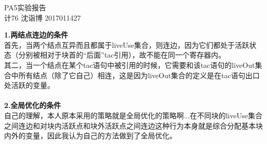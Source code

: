 \documentclass[UTF8]{ctexart}
\begin{document}
\begin{center}
PA5实验报告\\
计76 沈诣博 2017011427
\end{center}
\textbf{1.两结点连边的条件}\\
首先，当两个结点互异而且都属于liveUse集合，则连边，因为它们都处于活跃状态（分别被相对于块首的“后面”tac引用），故不能在同一个寄存器内。\\
其二，当一个结点在某个tac语句中被引用的时候，它需要和该tac语句的liveOut集合中所有结点（除了它自己）相连，这是因为liveOut集合的定义是在tac语句出口处活跃的变量。\\\\
\textbf{2.全局优化的条件}\\
自己的理解，本人原本采用的策略就是全局优化的策略啊...在不同块的liveUse集合之间连边和对块内活跃点和块外活跃点之间连边这种行为本身就是综合分配基本块内外的变量，因此我认为自己的方法做到了全局优化。
\end{document}
